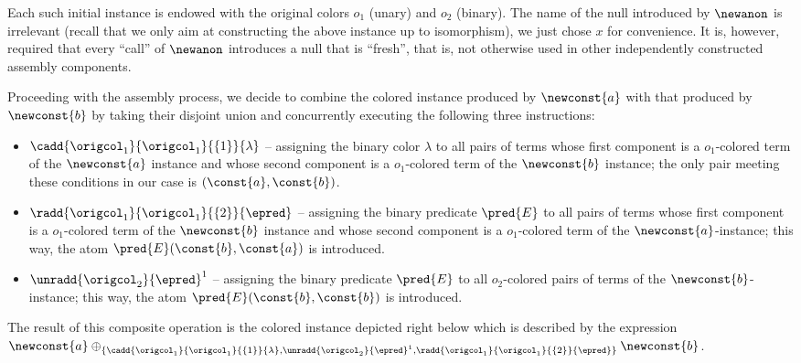 \begin{example}
Each such initial instance is endowed with the original colors $o_1$ (unary) and $o_2$ (binary). %
The name of the null introduced by $\newanon$ is irrelevant (recall that we only aim at constructing the above instance up to isomorphism), we just chose $x$ for convenience. It is, however, required that every ``call'' of $\newanon$ introduces a null that is ``fresh'', that is, not otherwise used in other independently constructed assembly components. 


Proceeding with the assembly process, we decide to combine the colored instance produced by $\newconst{a}$ with that produced by $\newconst{b}$ by taking their disjoint union and concurrently executing the following three instructions:
\begin{itemize}
\item $\cadd{\origcol_1}{\origcol_1}{\{1\}}{\lambda}$ -- assigning the binary color $\lambda$ to all pairs of terms whose first component is a $o_1$-colored term of the $\newconst{a}$ instance and whose second component  is a $o_1$-colored term of the $\newconst{b}$ instance; the only pair meeting these conditions in our case is $(\const{a},\const{b})$.
\item $\radd{\origcol_1}{\origcol_1}{\{2\}}{\epred}$ -- assigning the binary predicate $\pred{E}$ to all pairs of terms whose first component is a $o_1$-colored term of the $\newconst{b}$ instance and whose second component  is a $o_1$-colored term of the $\newconst{a}$-instance; this way, the atom $\pred{E}(\const{b},\const{a})$ is introduced.
\item $\unradd{\origcol_{2}}{\epred}^{1}$ -- assigning the binary predicate $\pred{E}$ to all $o_2$-colored pairs of terms of the $\newconst{b}$-instance; this way, the atom $\pred{E}(\const{b},\const{b})$ is introduced.
\end{itemize}
%
The result of this composite operation is the colored instance depicted right below which is described by the expression  $\newconst{a} \oplus_{\{ 	\cadd{\origcol_1}{\origcol_1}{\{1\}}{\lambda},
	\unradd{\origcol_{2}}{\epred}^{1}, 
	\radd{\origcol_1}{\origcol_1}{\{2\}}{\epred} \}} \newconst{b}$.\\[-0ex] 

\begin{center}
\begin{tikzpicture}[level/.style={sibling distance=60mm/#1, level distance=15mm}]
		

\end{tikzpicture}
\end{center}
\end{example}
